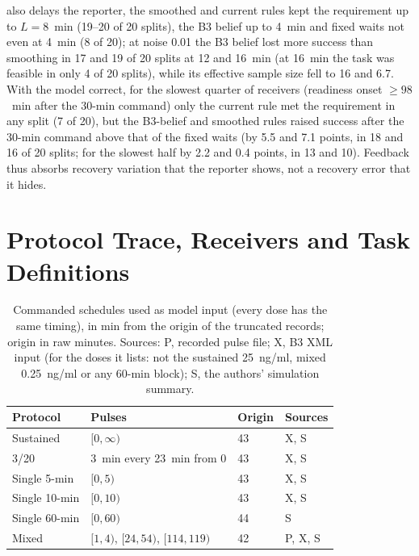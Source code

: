 \documentclass[conference]{IEEEtran}
\begin{document}
also delays the reporter, the smoothed and current rules kept the requirement up to $L=8$~min (19--20 of 20 splits), the B3 belief up to 4~min and fixed waits not even at 4~min (8 of 20); at noise 0.01 the B3 belief lost more success than smoothing in 17 and 19 of 20 splits at 12 and 16~min (at 16~min the task was feasible in only 4 of 20 splits), while its effective sample size fell to 16 and 6.7. With the model correct, for the slowest quarter of receivers (readiness onset $\geq98$~min after the 30-min command) only the current rule met the requirement in any split (7 of 20), but the B3-belief and smoothed rules raised success after the 30-min command above that of the fixed waits (by 5.5 and 7.1 points, in 18 and 16 of 20 splits; for the slowest half by 2.2 and 0.4 points, in 13 and 10). Feedback thus absorbs recovery variation that the reporter shows, not a recovery error that it hides.

\section{Protocol Trace, Receivers and Task Definitions}
\label{sec:s-audit}
\begin{table}[t]
\caption{Commanded schedules used as model input (every dose has the same timing), in min from the origin of the truncated records; origin in raw minutes. Sources: P, recorded pulse file; X, B3 XML input (for the doses it lists: not the sustained 25~ng/ml, mixed 0.25~ng/ml or any 60-min block); S, the authors' simulation summary.}
\label{tab:s-protocols}
\centering\footnotesize\setlength{\tabcolsep}{2.5pt}
\begin{tabular}{llll}
\toprule
Protocol & Pulses & Origin & Sources \\
\midrule
Sustained & $[0,\infty)$ & 43 & X, S \\
3/20 & 3~min every 23~min from 0 & 43 & X, S \\
Single 5-min & $[0,5)$ & 43 & X, S \\
Single 10-min & $[0,10)$ & 43 & X, S \\
Single 60-min & $[0,60)$ & 44 & S \\
Mixed & $[1,4)$, $[24,54)$, $[114,119)$ & 42 & P, X, S \\
\bottomrule
\end{tabular}
\end{table}
\end{document}
